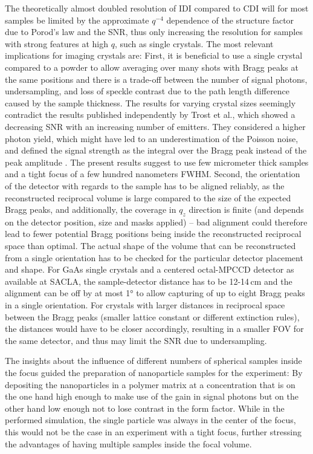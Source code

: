 The theoretically almost doubled resolution of IDI compared to CDI will for most samples be limited by the approximate $q^{-4}$ dependence of the structure factor due to Porod's law and the SNR, thus only increasing the resolution for samples with strong features at high $q$, such as single crystals.
The most relevant implications for imaging crystals are: First, it is beneficial to use a single crystal compared to a powder to allow averaging over many shots with Bragg peaks at the same positions and there is a trade-off between the number of signal photons, undersampling, and loss of speckle contrast due to the path length difference caused by the sample thickness. The results for varying crystal sizes seemingly contradict the results published independently by Trost et al., which showed a decreasing SNR with an increasing number of emitters. They considered a higher photon yield, which might have led to an underestimation of the Poisson noise, and defined the signal strength as the integral over the Bragg peak instead of the peak amplitude \cite{trost2020}. The present results suggest to use few micrometer thick samples and a tight focus of a few hundred nanometers FWHM. Second, the orientation of the detector with regards to the sample has to be aligned reliably, as the reconstructed reciprocal volume is large compared to the size of the expected Bragg peaks, and additionally, the coverage in $q_z$ direction is finite (and depends on the detector position, size and masks applied) -- bad alignment could therefore lead to fewer potential Bragg positions being inside the reconstructed reciprocal space than optimal. The actual shape of the volume that can be reconstructed from a single orientation has to be checked for the particular detector placement and shape.  For GaAs single crystals and a centered octal-MPCCD detector as available at SACLA, the sample-detector distance has to be 12-14\,cm and the alignment can be off by at most 1° to allow capturing of up to eight Bragg peaks in a single orientation. For crystals with larger distances in reciprocal space between the Bragg peaks (smaller lattice constant or different extinction rules), the distances would have to be closer accordingly, resulting in a smaller FOV for the same detector, and thus may limit the SNR due to undersampling.

The insights about the influence of different numbers of spherical samples inside the focus guided the preparation of nanoparticle samples for the experiment: By depositing the nanoparticles in a polymer matrix at a concentration that is on the one hand high enough to make use of the gain in signal photons but on the other hand low enough not to lose contrast in the form factor. While in the performed simulation, the single particle was always in the center of the focus, this would not be the case in an experiment with a tight focus, further stressing the advantages of having multiple samples inside the focal volume.

